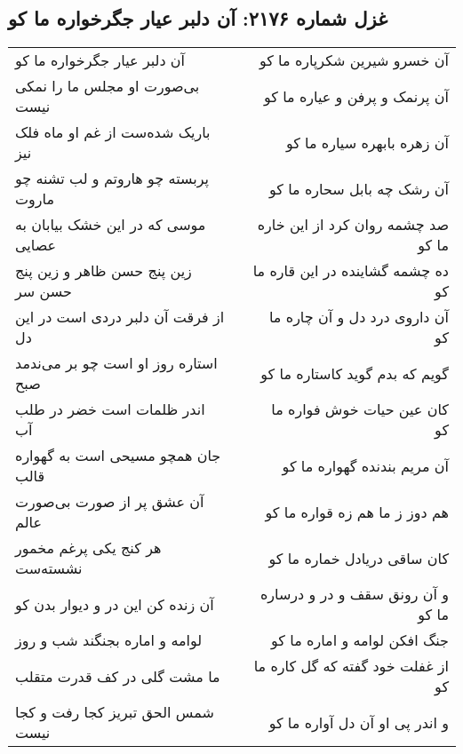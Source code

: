 \begin{center}
\section*{غزل شماره ۲۱۷۶: آن دلبر عیار جگرخواره ما کو}
\label{sec:2176}
\begin{longtable}{l p{0.5cm} r}
آن دلبر عیار جگرخواره ما کو
&&
آن خسرو شیرین شکرپاره ما کو
\\
بی‌صورت او مجلس ما را نمکی نیست
&&
آن پرنمک و پرفن و عیاره ما کو
\\
باریک شده‌ست از غم او ماه فلک نیز
&&
آن زهره بابهره سیاره ما کو
\\
پربسته چو هاروتم و لب تشنه چو ماروت
&&
آن رشک چه بابل سحاره ما کو
\\
موسی که در این خشک بیابان به عصایی
&&
صد چشمه روان کرد از این خاره ما کو
\\
زین پنج حسن ظاهر و زین پنج حسن سر
&&
ده چشمه گشاینده در این قاره ما کو
\\
از فرقت آن دلبر دردی است در این دل
&&
آن داروی درد دل و آن چاره ما کو
\\
استاره روز او است چو بر می‌ندمد صبح
&&
گویم که بدم گوید کاستاره ما کو
\\
اندر ظلمات است خضر در طلب آب
&&
کان عین حیات خوش فواره ما کو
\\
جان همچو مسیحی است به گهواره قالب
&&
آن مریم بندنده گهواره ما کو
\\
آن عشق پر از صورت بی‌صورت عالم
&&
هم دوز ز ما هم زه قواره ما کو
\\
هر کنج یکی پرغم مخمور نشسته‌ست
&&
کان ساقی دریادل خماره ما کو
\\
آن زنده کن این در و دیوار بدن کو
&&
و آن رونق سقف و در و درساره ما کو
\\
لوامه و اماره بجنگند شب و روز
&&
جنگ افکن لوامه و اماره ما کو
\\
ما مشت گلی در کف قدرت متقلب
&&
از غفلت خود گفته که گل کاره ما کو
\\
شمس الحق تبریز کجا رفت و کجا نیست
&&
و اندر پی او آن دل آواره ما کو
\\
\end{longtable}
\end{center}
